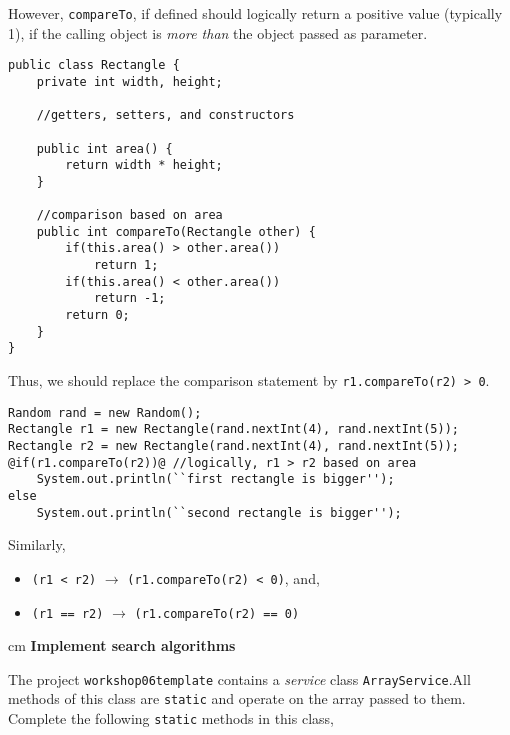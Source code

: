 \begin{questions}
\begin{enumerate}
However, \texttt{compareTo}, if defined should logically return a positive value (typically 1), if the calling object is \emph{more than} the object passed as parameter. 

\begin{lstlisting}
public class Rectangle {
	private int width, height;
	
	//getters, setters, and constructors
	
	public int area() {
		return width * height;
	}
	
	//comparison based on area
	public int compareTo(Rectangle other) {
		if(this.area() > other.area())
			return 1;
		if(this.area() < other.area())
			return -1;
		return 0;
	}
}
\end{lstlisting}

Thus, we should replace the comparison statement by \texttt{r1.compareTo(r2) > 0}.

\begin{lstlisting}[style=correct]
Random rand = new Random();
Rectangle r1 = new Rectangle(rand.nextInt(4), rand.nextInt(5));
Rectangle r2 = new Rectangle(rand.nextInt(4), rand.nextInt(5));
@if(r1.compareTo(r2))@ //logically, r1 > r2 based on area
	System.out.println(``first rectangle is bigger'');
else
	System.out.println(``second rectangle is bigger'');
\end{lstlisting}

Similarly, 
\begin{itemize}
\item \texttt{(r1 < r2)} $\rightarrow$ \texttt{(r1.compareTo(r2) < 0)}, and,
\item \texttt{(r1 == r2)} $\rightarrow$ \texttt{(r1.compareTo(r2) == 0)}
\end{itemize}
\end{enumerate}

 cm \question \textbf{Implement search algorithms} \vskip 0.5cm

The project \texttt{workshop06template} contains a \emph{service} class \texttt{ArrayService}.All methods of this class are \texttt{static} and operate on the array passed to them. Complete the following \texttt{static} methods in this class,


\end{questions}
